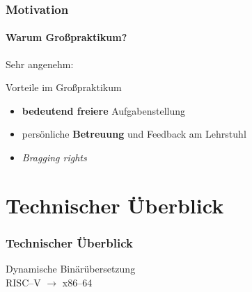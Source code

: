 \documentclass[aspectratio=169, sectionpage=false, german]{tumbeamer}
\newcommand{\refer}[0]{\ensuremath{\rightarrow} }
\begin{document}
\begin{frame}
	\frametitle{Motivation}
	\framesubtitle{Warum Großpraktikum?}
	
	Sehr angenehm:
	
	\vspace{0.25cm}
	
	\begin{block}{Vorteile im Großpraktikum}
		\begin{itemize}
			\item \textbf{bedeutend freiere} Aufgabenstellung
			\item persönliche \textbf{Betreuung} und Feedback am Lehrstuhl
			\item \textit{Bragging rights}
		\end{itemize}
	\end{block}
\end{frame}

\section{Technischer Überblick}
\begin{frame}[c]
	\frametitle{Technischer Überblick}
	\centering\Huge
	Dynamische Binärübersetzung\\RISC--V \refer x86--64
\end{frame}
\end{document}
